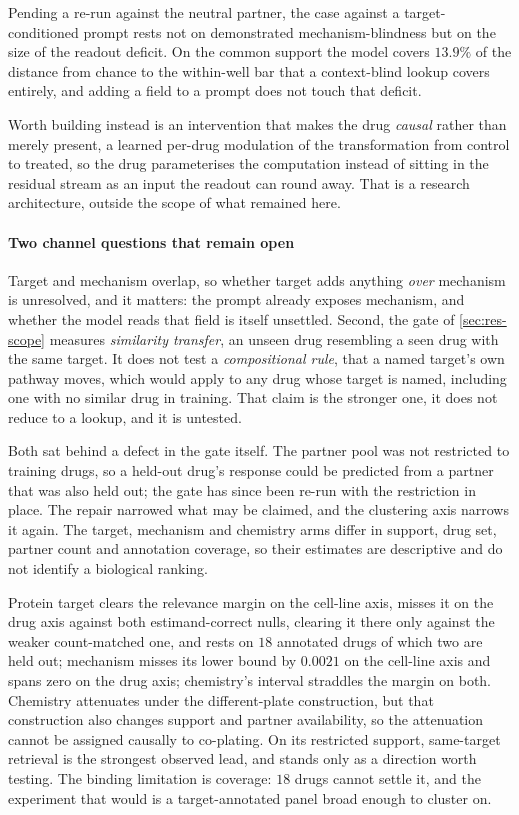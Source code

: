Pending a re-run against the neutral partner, the case against a
target-conditioned prompt rests not on demonstrated mechanism-blindness but on
the size of the readout deficit. On the common support the model covers $13.9\%$
of the distance from chance to the within-well bar that a context-blind lookup
covers entirely, and adding a field to a prompt does not touch that deficit.

Worth building instead is an intervention that makes the drug \emph{causal}
rather than merely present, a learned per-drug modulation of the transformation
from control to treated, so the drug parameterises the computation instead of
sitting in the residual stream as an input the readout can round away. That is a
research architecture, outside the scope of what remained here.

\paragraph{Two channel questions that remain open} Target and mechanism overlap,
so whether target adds anything \emph{over} mechanism is unresolved, and it
matters: the prompt already exposes mechanism, and whether the model reads that
field is itself unsettled. Second, the gate of \cref{sec:res-scope}
measures \emph{similarity transfer}, an unseen drug resembling a seen drug with
the same target. It does not test a \emph{compositional rule}, that a named
target's own pathway moves, which would apply to any drug whose target is named,
including one with no similar drug in training. That claim is the stronger one,
it does not reduce to a lookup, and it is untested.

Both sat behind a defect in the gate itself. The partner pool was not restricted
to training drugs, so a held-out drug's response could be predicted from a
partner that was also held out; the gate has since been re-run with the
restriction in place. The repair narrowed what may be claimed, and the
clustering axis narrows it again. The target, mechanism and chemistry arms
differ in support, drug set, partner count and annotation coverage, so their
estimates are descriptive and do not identify a biological ranking.

Protein target clears the relevance margin on the cell-line axis, misses it on
the drug axis against both estimand-correct nulls, clearing it there only
against the weaker count-matched one, and rests on $18$ annotated drugs of which
two are held out; mechanism misses its lower bound by $0.0021$ on the cell-line
axis and spans zero on the drug axis; chemistry's interval straddles the margin
on both. Chemistry attenuates under the different-plate construction, but that
construction also changes support and partner availability, so the attenuation
cannot be assigned causally to co-plating. On its restricted support, same-target
retrieval is the strongest observed lead, and stands only as a direction worth
testing. The binding limitation is coverage: $18$ drugs cannot settle it, and
the experiment that would is a target-annotated panel broad enough to cluster
on.

